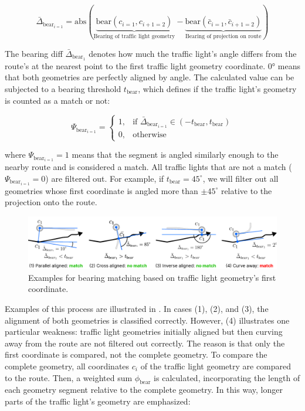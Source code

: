 \begin{equation}
    \bar{\Delta}_{\text{bear}_{i=1}} = 
        \text{abs}(\underbrace{\text{bear}(c_{i=1}, c_{i+1=2})}_{\text{Bearing of traffic light geometry}} - \underbrace{\text{bear}(\bar{c}_{i=1}, \bar{c}_{i+1=2})}_{\text{Bearing of projection on route}})
\end{equation}

The bearing diff $\bar{\Delta}_{\text{bear}_1}$ denotes how much the traffic light's angle differs from the route's at the nearest point to the first traffic light geometry coordinate. 0° means that both geometries are perfectly aligned by angle. The calculated value can be subjected to a bearing threshold $t_{\text{bear}}$, which defines if the traffic light's geometry is counted as a match or not:

\begin{equation}
\Psi_{\text{bear}_{i=1}} = 
    \begin{cases}
            1,& \text{if } \bar{\Delta}_{\text{bear}_{i=1}} \in \left(-t_{\text{bear}}, t_{\text{bear}}\right)\\
            0,              & \text{otherwise}
        \end{cases}
\end{equation}

where $\Psi_{\text{bear}_{i=1}} = 1$ means that the segment is angled similarly enough to the nearby route and is considered a match. All traffic lights that are not a match ($\Psi_{\text{bear}_{i=1}} = 0$) are filtered out. For example, if $t_{\text{bear}} = 45^{\circ}$, we will filter out all geometries whose first coordinate is angled more than $\pm 45^{\circ}$ relative to the projection onto the route. 

\begin{figure}[b]
\centering
\includegraphics[width=\linewidth]{images/sg-selection-bearing-filter.pdf}
\caption{Examples for bearing matching based on traffic light geometry's first coordinate.}
\label{fig:sg-selection-bearing-filter}
\end{figure}

Examples of this process are illustrated in . In cases (1), (2), and (3), the alignment of both geometries is classified correctly. However, (4) illustrates one particular weakness: traffic light geometries initially aligned but then curving away from the route are not filtered out correctly. The reason is that only the first coordinate is compared, not the complete geometry. To compare the complete geometry, all coordinates $c_i$ of the traffic light geometry are compared to the route. Then, a weighted sum $\phi_{\text{bear}}$ is calculated, incorporating the length of each geometry segment relative to the complete geometry. In this way, longer parts of the traffic light's geometry are emphasized:

